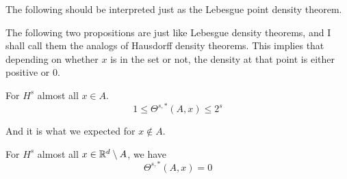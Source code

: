 \begin{note}
    The following should be interpreted just as the Lebesgue point density theorem.
\end{note}
The following two propositions are just like Lebesgue density theorems, and I shall call them the analogs of Hausdorff  density theorems. This implies that depending on whether $x$ is in the set or not, the density at that point is either positive or 0.
\begin{proposition}
    For $H^s$ almost all $x\in A$.
    \begin{equation*}
        1\leq\Theta^{s,*}(A,x)\leq 2^s
    \end{equation*}
\end{proposition}
And it is what we expected for $x\not\in A$.
\begin{proposition}
    For $H^s$ almost all $x\in\mathbb{R}^d\setminus A$, we have
    \begin{equation*}
        \Theta^{s,*}(A,x)=0
    \end{equation*}
\end{proposition}


